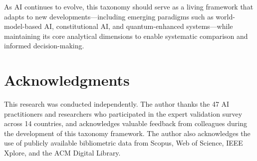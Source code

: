 \documentclass[11pt, a4paper]{article}
\begin{document}
As AI continues to evolve, this taxonomy should serve as a living framework that adapts to new developments---including emerging paradigms such as world-model-based AI, constitutional AI, and quantum-enhanced systems---while maintaining its core analytical dimensions to enable systematic comparison and informed decision-making.

\section*{Acknowledgments}
This research was conducted independently. The author thanks the 47 AI practitioners and researchers who participated in the expert validation survey across 14 countries, and acknowledges valuable feedback from colleagues during the development of this taxonomy framework. The author also acknowledges the use of publicly available bibliometric data from Scopus, Web of Science, IEEE Xplore, and the ACM Digital Library.



\end{document}
